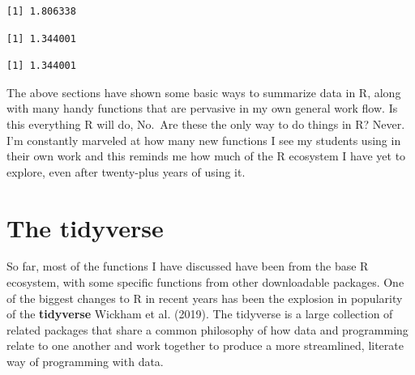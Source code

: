 \documentclass[
  letterpaper,
  DIV=11,
  numbers=noendperiod]{scrreprt}
\newenvironment{Shaded}{\begin{snugshade}}{\end{snugshade}}
\newcommand{\AttributeTok}[1]{\textcolor[rgb]{0.40,0.45,0.13}{#1}}
\newcommand{\CommentTok}[1]{\textcolor[rgb]{0.37,0.37,0.37}{#1}}
\newcommand{\ConstantTok}[1]{\textcolor[rgb]{0.56,0.35,0.01}{#1}}
\newcommand{\FunctionTok}[1]{\textcolor[rgb]{0.28,0.35,0.67}{#1}}
\newcommand{\NormalTok}[1]{\textcolor[rgb]{0.00,0.23,0.31}{#1}}
\newcommand{\SpecialCharTok}[1]{\textcolor[rgb]{0.37,0.37,0.37}{#1}}
\begin{document}
\begin{verbatim}
[1] 1.806338
\end{verbatim}

\begin{Shaded}
\end{Shaded}

\begin{verbatim}
[1] 1.344001
\end{verbatim}

\begin{Shaded}
\end{Shaded}

\begin{verbatim}
[1] 1.344001
\end{verbatim}

The above sections have shown some basic ways to summarize data in R,
along with many handy functions that are pervasive in my own general
work flow. Is this everything R will do, No.~Are these the only way to
do things in R? Never. I'm constantly marveled at how many new functions
I see my students using in their own work and this reminds me how much
of the R ecosystem I have yet to explore, even after twenty-plus years
of using it.

\hypertarget{the-tidyverse}{%
\section{The tidyverse}\label{the-tidyverse}}

So far, most of the functions I have discussed have been from the base R
ecosystem, with some specific functions from other downloadable
packages. One of the biggest changes to R in recent years has been the
explosion in popularity of the \textbf{tidyverse} Wickham et al. (2019).
The tidyverse is a large collection of related packages that share a
common philosophy of how data and programming relate to one another and
work together to produce a more streamlined, literate way of programming
with data.
\end{document}
